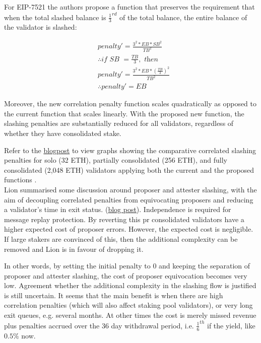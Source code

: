 For EIP-7521 the authors propose a function that preserves the requirement that when the total slashed balance is $\frac{1}{3}^{rd}$ of the total balance, the entire balance of the validator is slashed:

\begin{equation*}
\begin{split}
& penalty' = \frac{3^2 * EB * SB^2}{TB^2} \\
& \therefore \textit{if SB } = \frac{TB}{3}, \textit{ then} \\
& penalty' =   \frac{3^2 * EB * \left(  \frac{TB}{3} \right)^2 }{TB^2} \\
& \therefore penalty' = EB
\end{split}
\end{equation*}

Moreover, the new correlation penalty function scales quadratically as opposed to the current function that scales linearly. With the proposed new function, the slashing penalties are substantially reduced for all validators, regardless of whether they have consolidated stake.

Refer to the \href{https://notes.ethereum.org/@mikeneuder/slashings-eip-7251}{blogpost} to view graphs showing the comparative correlated slashing penalties for solo (32 ETH), partially consolidated (256 ETH), and fully consolidated (2,048 ETH) validators applying both the current and the proposed functions \cite{Neuder2023d}. \\

Lion summarised some discussion around proposer and attester slashing, with the aim of decoupling correlated penalties from equivocating proposers and reducing a validator's time in exit status. (\href{https://hackmd.io/@dapplion/S1pGYKR_T}{blog post}). Independence is required for message replay protection. By reverting this \gls{pr} consolidated validators have a higher expected cost of proposer errors. However, the expected cost is negligible. If large stakers are convinced of this, then the additional complexity can be removed and Lion is in favour of dropping it.

In other words, by setting the initial penalty to 0 and keeping the separation of proposer and attester slashing, the cost of proposer equivocation becomes very low. Agreement whether the additional complexity in the slashing flow is justified is still uncertain. It seems that the main benefit is when there are high correlation penalties (which will also affect staking pool validators), or very long exit queues, e.g. several months. At other times the cost is merely missed revenue plus penalties accrued over the 36 day withdrawal period, i.e. $\frac{1}{6}^{th}$ if the yield, like $0.5\%$ now.



